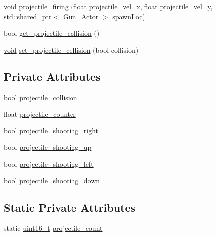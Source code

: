 \begin{DoxyCompactItemize}
\item 
\hyperlink{imgui__impl__opengl3__loader_8h_ac668e7cffd9e2e9cfee428b9b2f34fa7}{void} \hyperlink{classProjectile__Actor_a04cc0baaa196235c85f628c92327c23b}{projectile\+\_\+firing} (float projectile\+\_\+vel\+\_\+x, float projectile\+\_\+vel\+\_\+y, std\+::shared\+\_\+ptr$<$ \hyperlink{classGun__Actor}{Gun\+\_\+\+Actor} $>$ spawn\+Loc)
\item 
bool \hyperlink{classProjectile__Actor_a205f34a830ec6d19a87d978d63d52922}{get\+\_\+projectile\+\_\+collision} ()
\item 
\hyperlink{imgui__impl__opengl3__loader_8h_ac668e7cffd9e2e9cfee428b9b2f34fa7}{void} \hyperlink{classProjectile__Actor_a5bad8780253a216f0ed9bf160cc2c760}{set\+\_\+projectile\+\_\+collision} (bool collision)
\end{DoxyCompactItemize}
\subsection*{Private Attributes}
\begin{DoxyCompactItemize}
\item 
bool \hyperlink{classProjectile__Actor_a14073ceee00cc59d7aa87574413816f1}{projectile\+\_\+collision}
\item 
float \hyperlink{classProjectile__Actor_a43a1b9d877211660fbfe425d0ee4f9c1}{projectile\+\_\+counter}
\item 
bool \hyperlink{classProjectile__Actor_afbbd91b7ac2df24126906c9eebc6373d}{projectile\+\_\+shooting\+\_\+right}
\item 
bool \hyperlink{classProjectile__Actor_a68a49440a92e4df0b57ad1f585db53a6}{projectile\+\_\+shooting\+\_\+up}
\item 
bool \hyperlink{classProjectile__Actor_aeedc983cf4854fa176e7e1fb76f9fcf4}{projectile\+\_\+shooting\+\_\+left}
\item 
bool \hyperlink{classProjectile__Actor_a9e11ed3fc1da2a1ff487f14c6db6cff4}{projectile\+\_\+shooting\+\_\+down}
\end{DoxyCompactItemize}
\subsection*{Static Private Attributes}
\begin{DoxyCompactItemize}
\item 
static \hyperlink{stdint_8h_a273cf69d639a59973b6019625df33e30}{uint16\+\_\+t} \hyperlink{classProjectile__Actor_ad22a18a63f3e8ec1c37a726bf23e64d0}{projectile\+\_\+count}
\end{DoxyCompactItemize}
